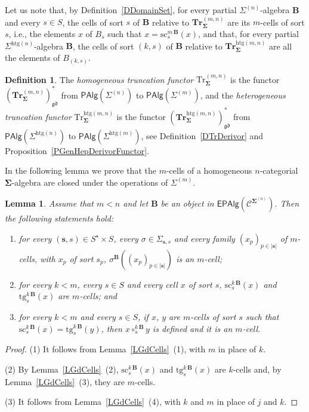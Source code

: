 \documentclass[a4paper, reqno]{amsbook}
\newcommand{\bb}[1]{\ensuremath{\lvert #1 \rvert}}
\newcommand{\sig}[1]{\mathbf{#1}}             %
\newcommand{\spec}[1]{\boldsymbol{\mathcal{#1}}} %
\newcommand{\gd}{\mathfrak{gd}}              %
\newcommand{\htg}{\mathrm{htg}}                %
\newcommand{\src}{\mathrm{sc}}
\newcommand{\tgt}{\mathrm{tg}}
\newcommand{\Tr}{\mathrm{Tr}}
\newcommand{\bTr}{\mathbf{Tr}}
\theoremstyle{plain}
\newtheorem{lemma}[theorem]{Lemma}
\theoremstyle{definition}
\newtheorem{definition}[theorem]{Definition}
\begin{document}
Let us note that, by Definition~\ref{DDomainSet}, for every partial $\Sigma^{(n)}$-algebra $\mathbf{B}$ and every $s\in S$, the cells of sort $s$ of $\mathbf{B}$ relative to $\bTr^{(m,n)}_{\sig{\Sigma}}$ are its $m$-cells of sort $s$, i.e., the elements $x$ of $B_{s}$ such that $x=\src^{m\,\mathbf{B}}_{s}(x)$, and that, for every partial $\Sigma^{\htg(n)}$-algebra $\mathbf{B}$, the cells of sort $(k,s)$ of $\mathbf{B}$ relative to $\bTr^{\htg(m,n)}_{\sig{\Sigma}}$ are all the elements of $B_{(k,s)}$.

\begin{definition}\label{DTrFunctor}
The \emph{homogeneous truncation functor} $\Tr^{(m,n)}_{\sig{\Sigma}}$ is the functor $(\bTr^{(m,n)}_{\sig{\Sigma}})^{\ast}_{\gd}$ from $\mathsf{PAlg}(\Sigma^{(n)})$ to $\mathsf{PAlg}(\Sigma^{(m)})$, and the \emph{heterogeneous truncation functor} $\Tr^{\htg(m,n)}_{\sig{\Sigma}}$ is the functor $(\bTr^{\htg(m,n)}_{\sig{\Sigma}})^{\ast}_{\gd}$ from $\mathsf{PAlg}(\Sigma^{\htg(n)})$ to $\mathsf{PAlg}(\Sigma^{\htg(m)})$, see Definition~\ref{DTrDerivor} and Proposition~\ref{PGenHepDerivorFunctor}.
\end{definition}

In the following lemma we prove that the $m$-cells of a homogeneous $n$-categorial $\sig{\Sigma}$-algebra are closed under the operations of $\Sigma^{(m)}$.

\begin{lemma}\label{LTrCells}
Assume that $m<n$ and let $\mathbf{B}$ be an object in $\mathsf{EPAlg}(\spec{C}^{\sig{\Sigma}^{(n)}})$.
Then the following statements hold:
\begin{enumerate}
\item for every $(\mathbf{s},s)\in S^{\star}\times S$, every $\sigma\in\Sigma_{\mathbf{s},s}$ and every family $(x_{p})_{p\in\bb{\mathbf{s}}}$ of $m$-cells, with $x_{p}$ of sort $s_{p}$, $\sigma^{\mathbf{B}}((x_{p})_{p\in\bb{\mathbf{s}}})$ is an $m$-cell;
\item for every $k<m$, every $s\in S$ and every cell $x$ of sort $s$, $\src^{k\,\mathbf{B}}_{s}(x)$ and $\tgt^{k\,\mathbf{B}}_{s}(x)$ are $m$-cells; and
\item for every $k<m$ and every $s\in S$, if $x$, $y$ are $m$-cells of sort $s$ such that $\src^{k\,\mathbf{B}}_{s}(x)=\tgt^{k\,\mathbf{B}}_{s}(y)$, then $x\circ^{k\,\mathbf{B}}_{s}y$ is defined and it is an $m$-cell.
\end{enumerate}
\end{lemma}
\begin{proof}
(1) It follows from Lemma~\ref{LGdCells}~(1), with $m$ in place of $k$.

(2) By Lemma~\ref{LGdCells}~(2), $\src^{k\,\mathbf{B}}_{s}(x)$ and $\tgt^{k\,\mathbf{B}}_{s}(x)$ are $k$-cells and, by Lemma~\ref{LGdCells}~(3), they are $m$-cells.

(3) It follows from Lemma~\ref{LGdCells}~(4), with $k$ and $m$ in place of $j$ and $k$.
\end{proof}
\end{document}
